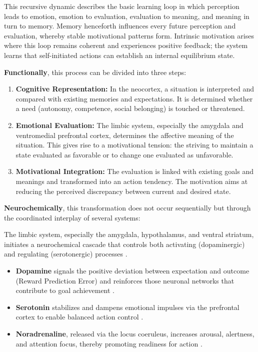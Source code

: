 This recursive dynamic describes the basic learning loop in which perception leads to emotion, emotion to evaluation, evaluation to meaning, and meaning in turn to memory. Memory henceforth influences every future perception and evaluation, whereby stable motivational patterns form. Intrinsic motivation arises where this loop remains coherent and experiences positive feedback; the system learns that self-initiated actions can establish an internal equilibrium state.

\textbf{Functionally}, this process can be divided into three steps:

\begin{enumerate}
\item \textbf{Cognitive Representation:} In the neocortex, a situation is interpreted and compared with existing memories and expectations. It is determined whether a need (autonomy, competence, social belonging) is touched or threatened.
\item \textbf{Emotional Evaluation:} The limbic system, especially the amygdala and ventromedial prefrontal cortex, determines the affective meaning of the situation. This gives rise to a motivational tension: the striving to maintain a state evaluated as favorable or to change one evaluated as unfavorable.
\item \textbf{Motivational Integration:} The evaluation is linked with existing goals and meanings and transformed into an action tendency. The motivation aims at reducing the perceived discrepancy between current and desired state.
\end{enumerate}

\textbf{Neurochemically}, this transformation does not occur sequentially but through the coordinated interplay of several systems:

The limbic system, especially the amygdala, hypothalamus, and ventral striatum, initiates a neurochemical cascade that controls both activating (dopaminergic) and regulating (serotonergic) processes \cite{LeDoux1996, Panksepp1998, Damasio1999}.

\begin{itemize}
\item \textbf{Dopamine} signals the positive deviation between expectation and outcome (Reward Prediction Error) and reinforces those neuronal networks that contribute to goal achievement \cite{Schultz1997}.
\item \textbf{Serotonin} stabilizes and dampens emotional impulses via the prefrontal cortex to enable balanced action control \cite{CarverScheier1998, Cools2008}.
\item \textbf{Noradrenaline}, released via the locus coeruleus, increases arousal, alertness, and attention focus, thereby promoting readiness for action \cite{AstonJones2005}.
\end{itemize}

